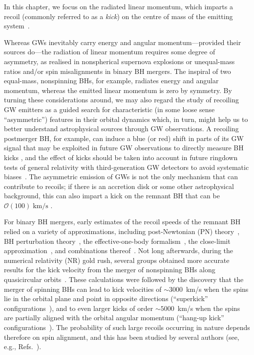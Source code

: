 In this chapter, we focus on the radiated linear momentum, which
imparts a recoil (commonly referred to as a \emph{kick}) on the centre
of mass of the emitting
system~\cite{Bonnor1961-wy,Peres:1962zz,Bekenstein:1973zz}.

Whereas GWs inevitably carry energy and angular momentum---provided
their sources do---the radiation of linear momentum requires some
degree of asymmetry, as realised in nonspherical supernova explosions
or unequal-mass ratios and/or spin misalignments in binary BH
mergers. The inspiral of two equal-mass, nonspinning BHs, for example,
radiates energy and angular momentum, whereas the emitted linear
momentum is zero by symmetry. By turning these considerations around,
we may also regard the study of recoiling GW emitters as a guided
search for characteristic (in some loose sense ``asymmetric'')
features in their orbital dynamics which, in turn, might help us to
better understand astrophysical sources through GW observations.
A recoiling postmerger BH, for example, can induce a blue (or
red) shift in parts of its GW signal that may be exploited in future
GW observations to directly measure BH kicks
\cite{Gerosa:2016vip,CalderonBustillo:2018zuq,Lousto:2019lyf}, and
the effect of kicks should be taken into account in future ringdown
tests of general relativity with third-generation GW detectors to
avoid systematic biases~\cite{Varma:2020nbm}.
The asymmetric emission of GWs is not the only mechanism that
can contribute to recoils; if there is an accretion disk or some other
astrophysical background, this can also impart a kick on the remnant
BH that can be $\mathcal{O}(100)\;\mathrm{km/s}$ \cite{Cardoso:2020lxx}.

For binary BH mergers, early estimates of the recoil speeds of the
remnant BH relied on a variety of approximations, including
post-Newtonian (PN) theory~\cite{Fitchett1983-xq,Blanchet:2005rj}, BH
perturbation theory~\cite{Hughes:2004ck}, the effective-one-body
formalism~\cite{Damour:2006tr}, the close-limit
approximation~\cite{Sopuerta:2006wj,Sopuerta:2006et}, and combinations
thereof~\cite{LeTiec:2009yg}. Not long afterwards, during the
numerical relativity (NR) gold rush, several groups obtained more
accurate results for the kick velocity from the merger of nonspinning
BHs along
quasicircular
orbits~\cite{Baker:2006vn,Gonzalez:2006md,Herrmann:2007cwl}.
These calculations were followed by the discovery that the merger of
spinning BHs can lead to kick velocities of $\sim 3000$~km/s when the
spins lie in the orbital plane and point in opposite directions
(``superkick''
configurations~\cite{Gonzalez:2007hi,Campanelli:2007cga,Campanelli:2007ew}),
and to even larger kicks of order $\sim 5000$~km/s when the spins are
partially aligned with the orbital angular momentum (``hang-up kick''
configurations~\cite{Lousto:2011kp}).
The probability of such large
recoils occurring in nature depends therefore on spin alignment, and
this has been studied by several authors (see, e.g.,
Refs.~\cite{Schnittman:2007sn,Dotti:2009vz,Kesden:2010ji,Lousto:2012su,Berti:2012zp,Lousto:2012su}).

